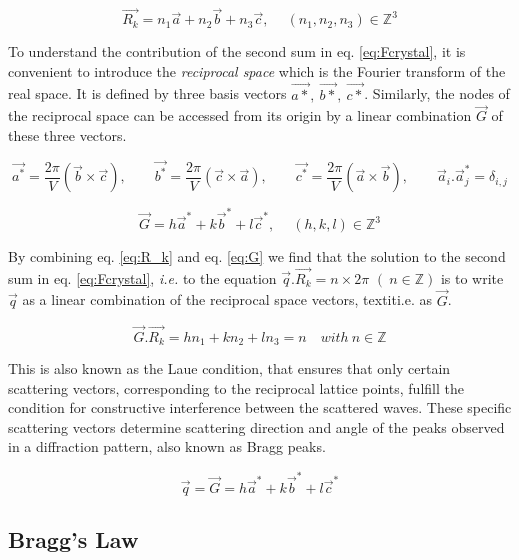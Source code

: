 \begin{equation}
    \label{eq:R_k}
    \vec{R_k}=n_1\vec{a} + n_2\vec{b} + n_3\vec{c}, \quad \ (n_1,n_2,n_3) \in \mathbb{Z}^3
\end{equation}

To understand the contribution of the second sum in eq. \ref{eq:Fcrystal}, it is convenient to introduce the \textit{reciprocal space} which is the Fourier transform of the real space.
It is defined by three basis vectors $\vec{a*},\ \vec{b*},\ \vec{c*}$.
Similarly, the nodes of the reciprocal space can be accessed from its origin by a linear combination $\vec{G}$ of these three vectors.

\begin{equation}
    \vec{a^*}=\frac{2\pi}{V}(\vec{b}\times \vec{c}), \qquad
    \vec{b^*}=\frac{2\pi}{V}(\vec{c}\times \vec{a}), \qquad
    \vec{c^*}=\frac{2\pi}{V}(\vec{a}\times \vec{b}), \qquad
    \vec{a}_i . \vec{a}_j^* = \delta_{i,j}
\end{equation}

\begin{equation}
    \label{eq:G}
    \vec{G}=h\vec{a}^* + k\vec{b}^* + l\vec{c}^*, \quad \ (h,k,l) \in \mathbb{Z}^3
\end{equation}

By combining eq. \ref{eq:R_k} and eq. \ref{eq:G} we find that the solution to the second sum in eq. \ref{eq:Fcrystal}, \textit{i.e.} to the equation $\vec{q}.\vec{R_k} = n \times 2\pi$ $(\ n \in \mathbb{Z})$ is to write $\vec{q}$ as a linear combination of the reciprocal space vectors, textit{i.e.} as $\vec{G}$.

\begin{equation}
    \label{eq:LaueCond}
    \vec{G} . \vec{R_k} = hn_1 + kn_2 + ln_3 = n \quad  with \ n \in \mathbb{Z}
\end{equation}

This is also known as the Laue condition, that ensures that only certain scattering vectors, corresponding to the reciprocal lattice points, fulfill the condition for constructive interference between the scattered waves.
These specific scattering vectors determine scattering direction and angle of the peaks observed in a diffraction pattern, also known as Bragg peaks.

\begin{equation}
    \vec{q} = \vec{G}  = h\vec{a}^* + k\vec{b}^* + l\vec{c}^*
\end{equation}

\subsection{Bragg's Law}

